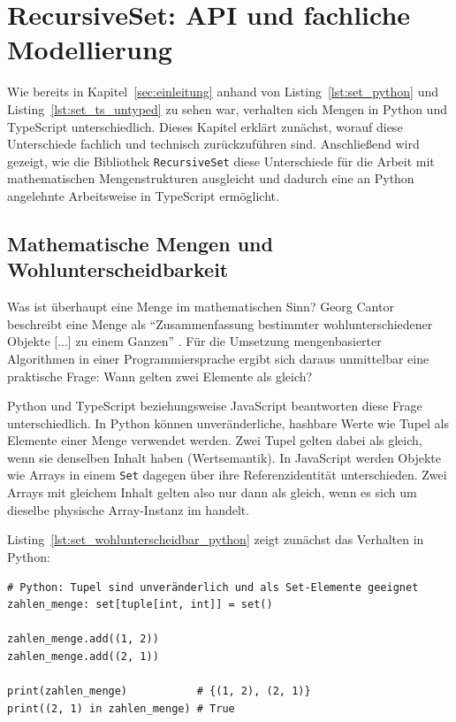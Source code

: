 
\section{RecursiveSet: API und fachliche Modellierung}
\label{sec:recursive-set-api}

Wie bereits in Kapitel~\ref{sec:einleitung} anhand von Listing~\ref{lst:set_python} und Listing~\ref{lst:set_ts_untyped} zu sehen war, verhalten sich Mengen in Python und TypeScript unterschiedlich. Dieses Kapitel erklärt zunächst, worauf diese Unterschiede fachlich und technisch zurückzuführen sind. Anschließend wird gezeigt, wie die Bibliothek \texttt{RecursiveSet} diese Unterschiede für die Arbeit mit mathematischen Mengenstrukturen ausgleicht und dadurch eine an Python angelehnte Arbeitsweise in TypeScript ermöglicht.

\subsection{Mathematische Mengen und Wohlunterscheidbarkeit}
\label{subsec:rs-api-wohlunterscheidbarkeit}

Was ist überhaupt eine Menge im mathematischen Sinn? Georg Cantor beschreibt eine Menge als \enquote{Zusammenfassung bestimmter wohlunterschiedener Objekte [...] zu einem Ganzen} \autocite[481]{Cantor1895}. Für die Umsetzung mengenbasierter Algorithmen in einer Programmiersprache ergibt sich daraus unmittelbar eine praktische Frage: Wann gelten zwei Elemente als gleich?

Python und TypeScript beziehungsweise JavaScript beantworten diese Frage unterschiedlich. In Python können unveränderliche, hashbare Werte wie Tupel als Elemente einer Menge verwendet werden. Zwei Tupel gelten dabei als gleich, wenn sie denselben Inhalt haben (Wertsemantik). In JavaScript werden Objekte wie Arrays in einem \texttt{Set} dagegen über ihre Referenzidentität unterschieden. Zwei Arrays mit gleichem Inhalt gelten also nur dann als gleich, wenn es sich um dieselbe physische Array-Instanz im  handelt.

Listing~\ref{lst:set_wohlunterscheidbar_python} zeigt zunächst das Verhalten in Python:

\begin{listing}[ht]
    \caption{Mengenverhalten in Python}
    \label{lst:set_wohlunterscheidbar_python}
    \begin{verbatim}
# Python: Tupel sind unveränderlich und als Set-Elemente geeignet
zahlen_menge: set[tuple[int, int]] = set()

zahlen_menge.add((1, 2))
zahlen_menge.add((2, 1))

print(zahlen_menge)           # {(1, 2), (2, 1)}
print((2, 1) in zahlen_menge) # True
    \end{verbatim}
\end{listing}

